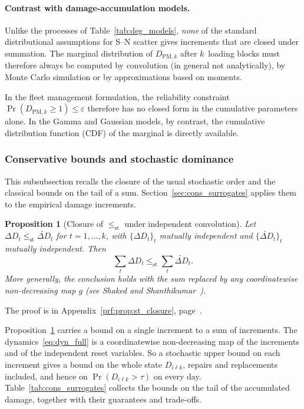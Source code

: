 \documentclass[11pt,a4paper]{article}
\theoremstyle{plain}
\newtheorem{proposition}[theorem]{Proposition}
\theoremstyle{definition}
\theoremstyle{remark}
\begin{document}
\paragraph{Contrast with damage-accumulation models.}
Unlike the processes of Table~\ref{tab:deg_models}, \emph{none} of the standard distributional assumptions for S--N scatter gives increments that are closed under summation.
The marginal distribution of $D_{\mathrm{PM},k}$ after $k$~loading blocks must therefore always be computed by convolution (in general not analytically), by Monte Carlo simulation or by approximations based on moments.

In the fleet management formulation, the reliability constraint $\Pr(D_{\mathrm{PM},k} \ge 1) \le \varepsilon$ therefore has no closed form in the cumulative parameters alone.
In the Gamma and Gaussian models, by contrast, the cumulative distribution function (CDF) of the marginal is directly available.



\subsubsection{Conservative bounds and stochastic dominance}

This subsubsection recalls the closure of the usual stochastic order and the classical bounds on the tail of a sum.
Section~\ref{sec:cons_surrogates} applies them to the empirical damage increments.

\begin{proposition}[Closure of $\le_{\mathrm{st}}$ under independent convolution]\label{prop:st_closure}
Let $\Delta D_t \le_{\mathrm{st}} \widetilde{\Delta D}_t$ for $t = 1,\dots,k$, with $\{\Delta D_t\}_t$ mutually independent and $\{\widetilde{\Delta D}_t\}_t$ mutually independent.
Then
\begin{equation}
  \sum_t \Delta D_t \le_{\mathrm{st}} \sum_t \widetilde{\Delta D}_t.
\end{equation}
More generally, the conclusion holds with the sum replaced by any coordinatewise non-decreasing map $g$ (see Shaked and Shanthikumar~\cite[\S1.A]{ShakedShanthikumar2007}).
\end{proposition}
The proof is in Appendix~\ref{prf:prop:st_closure}, page~\pageref{prf:prop:st_closure}.

Proposition~\ref{prop:st_closure} carries a bound on a single increment to a sum of increments.
The dynamics~\eqref{eq:dyn_full} is a coordinatewise non-decreasing map of the increments and of the independent reset variables.
So a stochastic upper bound on each increment gives a bound on the whole state $D_{i\ell k}$, repairs and replacements included, and hence on $\Pr(D_{i\ell k} > \tau)$ on every day.
Table~\ref{tab:cons_surrogates} collects the bounds on the tail of the accumulated damage, together with their guarantees and trade-offs.
\end{document}

